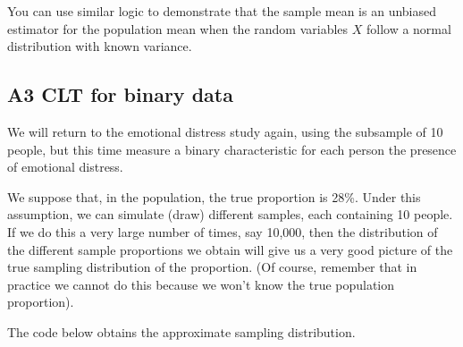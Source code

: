 \documentclass[letterpaper,10pt,english]{jupyterBook}
\begin{document}
\sphinxAtStartPar
{} You can use similar logic to demonstrate that the sample mean is an unbiased estimator for the population mean when the random variables \(X\) follow a normal distribution with known variance.


\subsection{A3 CLT for binary data}
\label{\detokenize{04.g. Population.and.samples:a3-clt-for-binary-data}}
\sphinxAtStartPar
We will return to the emotional distress study again, using the sub\sphinxhyphen{}sample of 10 people, but this time measure a binary characteristic for each person \sphinxhyphen{} the presence of emotional distress.

\sphinxAtStartPar
We suppose that, in the population, the true proportion is 28\%. Under this assumption, we can simulate (draw) different samples,  each containing 10 people. If we do this a very large number of times, say 10,000, then the distribution of the different sample proportions we obtain will give us a very good picture of the true sampling distribution of the proportion. (Of course, remember that in practice we cannot do this because we won’t know the true population proportion).

\sphinxAtStartPar
The code below obtains the approximate sampling distribution.
\end{document}
